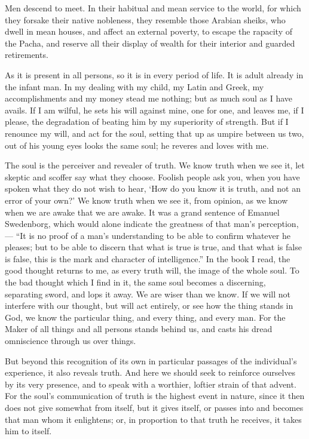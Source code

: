 \documentclass{article}
\begin{document}
Men descend to meet. In their habitual and mean service to the world, for which they forsake their native nobleness, they resemble those Arabian sheiks, who dwell in mean houses, and affect an external poverty, to escape the rapacity of the Pacha, and reserve all their display of wealth for their interior and guarded retirements.

As it is present in all persons, so it is in every period of life. It is adult already in the infant man. In my dealing with my child, my Latin and Greek, my accomplishments and my money stead me nothing; but as much soul as I have avails. If I am wilful, he sets his will against mine, one for one, and leaves me, if I please, the degradation of beating him by my superiority of strength. But if I renounce my will, and act for the soul, setting that up as umpire between us two, out of his young eyes looks the same soul; he reveres and loves with me.

The soul is the perceiver and revealer of truth. We know truth when we see it, let skeptic and scoffer say what they choose. Foolish people ask you, when you have spoken what they do not wish to hear, `How do you know it is truth, and not an error of your own?' We know truth when we see it, from opinion, as we know when we are awake that we are awake. It was a grand sentence of Emanuel Swedenborg, which would alone indicate the greatness of that man's perception, --- ``It is no proof of a man's understanding to be able to confirm whatever he pleases; but to be able to discern that what is true is true, and that what is false is false, this is the mark and character of intelligence.'' In the book I read, the good thought returns to me, as every truth will, the image of the whole soul. To the bad thought which I find in it, the same soul becomes a discerning, separating sword, and lops it away. We are wiser than we know. If we will not interfere with our thought, but will act entirely, or see how the thing stands in God, we know the particular thing, and every thing, and every man. For the Maker of all things and all persons stands behind us, and casts his dread omniscience through us over things.

But beyond this recognition of its own in particular passages of the individual's experience, it also reveals truth. And here we should seek to reinforce ourselves by its very presence, and to speak with a worthier, loftier strain of that advent. For the soul's communication of truth is the highest event in nature, since it then does not give somewhat from itself, but it gives itself, or passes into and becomes that man whom it enlightens; or, in proportion to that truth he receives, it takes him to itself.
\end{document}
